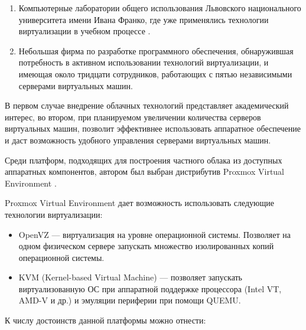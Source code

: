 \documentclass[10pt, a5paper]{article}
\begin{document}
\begin{enumerate}
  \item Компьютерные лаборатории общего использования Львовского национального университета имени Ивана Франко, где уже применялись технологии виртуализации в учебном процессе \cite{Vankevich3}.
  \item Небольшая фирма по разработке программного обеспечения, обнаружившая потребность в активном использовании технологий виртуализации, и имеющая около тридцати сотрудников, работающих с пятью независимыми серверами виртуальных машин.
\end{enumerate}

В первом случае внедрение облачных технологий представляет академический интерес, во втором, при планируемом увеличении количества серверов виртуальных машин, позволит эффективнее использовать аппаратное обеспечение и даст возможность удобного управления серверами виртуальных машин.

Среди платформ, подходящих для построения частного облака из доступных аппаратных компонентов, автором был выбран дистрибутив Proxmox Virtual Environment  \cite{Vankevich4}.

Proxmox Virtual Environment дает возможность использовать следующие технологии виртуализации:

\begin{itemize}
  \item OpenVZ --- виртуализация на уровне операционной системы. Позволяет на одном физическом сервере запускать множество изолированных копий операционной системы.
  \item KVM (Kernel-based Virtual Machine) --- позволяет запускать виртуализованную ОС при аппаратной поддержке процессора (Intel VT, AMD-V и др.) и эмуляции периферии при помощи QUEMU.
\end{itemize}

К числу достоинств данной платформы можно отнести:
\end{document}
